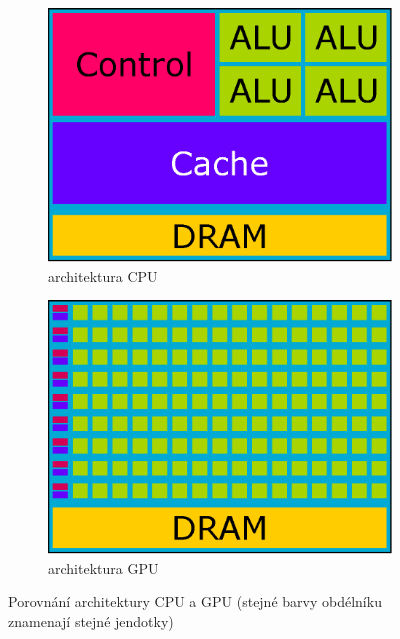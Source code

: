 \begin{figure}[h]
\centering
\begin{subfigure}{.49\textwidth}
  \centering
  \includegraphics[width=1\linewidth]{img/CPUarchitecture.eps}
  \caption{architektura CPU}
  \label{fig:cpuarchitecture}
\end{subfigure}
\begin{subfigure}{.49\textwidth}
  \centering
  \includegraphics[width=1\linewidth]{img/GPUarchitecture.eps}
  \caption{architektura GPU}
  \label{fig:gpuarchitecture}
\end{subfigure}
\caption{Porovnání architektury CPU a GPU (stejné barvy obdélníku znamenají stejné jendotky)}
\end{figure}

